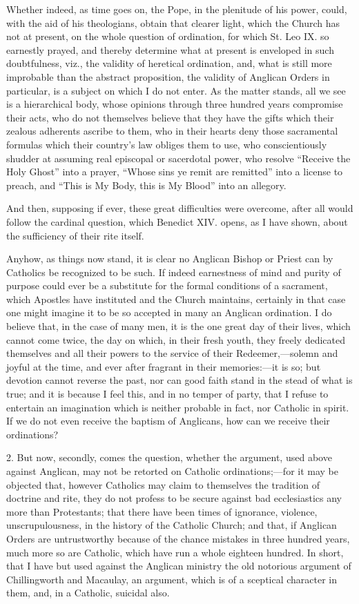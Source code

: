 Whether indeed, as time goes on, the Pope, in the plenitude of his
power, could, with the aid of his theologians, obtain that clearer
light, which the Church has not at present, on the whole question of
ordination, for which St. Leo IX. so earnestly prayed, and thereby
determine what at present is enveloped in such doubtfulness, viz., the
validity of heretical ordination, and, what is still more improbable
than the abstract proposition, the validity of Anglican Orders in
particular, is a subject on which I do not enter. As the matter
stands, all we see is a hierarchical body, whose opinions through
three hundred years compromise their acts, who do not themselves
believe that they have the gifts which their zealous adherents ascribe
to them, who in their hearts deny those sacramental formulas which
their country's law obliges them to use, who conscientiously shudder
at assuming real episcopal or sacerdotal power, who resolve
``Receive the Holy Ghost'' into a prayer, ``Whose sins ye
remit are remitted'' into a license to preach, and ``This is
My Body, this is My Blood'' into an allegory.

And then, supposing if ever, these great difficulties were
overcome, after all would follow the cardinal question, which Benedict
XIV. opens, as I have shown, about the sufficiency of their rite
itself.

Anyhow, as things now stand, it is clear no Anglican Bishop or
Priest can by Catholics be recognized to be such. If indeed
earnestness of mind and purity of purpose could ever be a substitute
for the formal conditions of a sacrament, which Apostles have
instituted and the Church maintains, certainly in that case one might
imagine it to be so accepted in many an Anglican ordination. I do
believe that, in the case of many men, it is the one great day of
their lives, which cannot come twice, the day on which, in their fresh
youth, they freely dedicated themselves and all their powers to the
service of their Redeemer,—solemn and joyful at the time, and ever
after fragrant in their memories:—it is so; but devotion cannot
reverse the past, nor can good faith stand in the stead of what is
true; and it is because I feel this, and in no temper of party, that I
refuse to entertain an imagination which is neither probable in fact,
nor Catholic in spirit. If we do not even receive the baptism of
Anglicans, how can we receive their ordinations?

2. But now, secondly, comes the question, whether the argument,
used above against Anglican, may not be retorted on Catholic
ordinations;—for it may be objected that, however Catholics may
claim to themselves the tradition of doctrine and rite, they do not
profess to be secure against bad ecclesiastics any more than
Protestants; that there have been times of ignorance, violence,
unscrupulousness, in the history of the Catholic Church; and that, if
Anglican Orders are untrustworthy because of the chance mistakes in
three hundred years, much more so are Catholic, which have run a whole
eighteen hundred. In short, that I have but used against the Anglican
ministry the old notorious argument of Chillingworth and Macaulay, an
argument, which is of a sceptical character in them, and, in a
Catholic, suicidal also.

